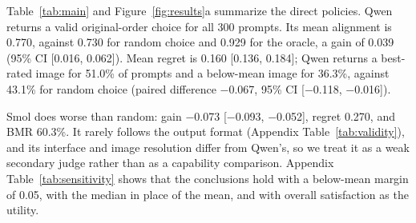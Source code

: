 Table~\ref{tab:main} and Figure~\ref{fig:results}a summarize the direct policies. Qwen returns a valid original-order choice for all 300 prompts. Its mean alignment is 0.770, against 0.730 for random choice and 0.929 for the oracle, a gain of 0.039 (95\% CI [0.016, 0.062]). Mean regret is 0.160 [0.136, 0.184]; Qwen returns a best-rated image for 51.0\% of prompts and a below-mean image for 36.3\%, against 43.1\% for random choice (paired difference $-$0.067, 95\% CI [$-$0.118, $-$0.016]).

Smol does worse than random: gain $-$0.073 [$-$0.093, $-$0.052], regret 0.270, and BMR 60.3\%. It rarely follows the output format (Appendix Table~\ref{tab:validity}), and its interface and image resolution differ from Qwen's, so we treat it as a weak secondary judge rather than as a capability comparison. Appendix Table~\ref{tab:sensitivity} shows that the conclusions hold with a below-mean margin of 0.05, with the median in place of the mean, and with overall satisfaction as the utility.
